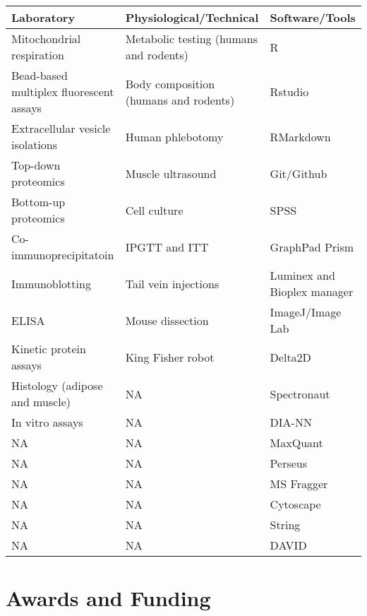 \documentclass[11pt,a4paper,]{awesome-cv}
\begin{document}
\begin{table}[!h]
\centering\begingroup\fontsize{8}{10}\selectfont

\begin{tabular}{lll}
\toprule
\textbf{Laboratory} & \textbf{Physiological/Technical} & \textbf{Software/Tools}\\
\midrule
Mitochondrial respiration & Metabolic testing (humans and rodents) & R\\
Bead-based multiplex fluorescent assays & Body composition (humans and rodents) & Rstudio\\
Extracellular vesicle isolations & Human phlebotomy & RMarkdown\\
Top-down proteomics & Muscle ultrasound & Git/Github\\
Bottom-up proteomics & Cell culture & SPSS\\
\addlinespace
Co-immunoprecipitatoin & IPGTT and ITT & GraphPad Prism\\
Immunoblotting & Tail vein injections & Luminex and Bioplex manager\\
ELISA & Mouse dissection & ImageJ/Image Lab\\
Kinetic protein assays & King Fisher robot & Delta2D\\
Histology (adipose and muscle) & NA & Spectronaut\\
\addlinespace
In vitro assays & NA & DIA-NN\\
NA & NA & MaxQuant\\
NA & NA & Perseus\\
NA & NA & MS Fragger\\
NA & NA & Cytoscape\\
\addlinespace
NA & NA & String\\
NA & NA & DAVID\\
\bottomrule
\end{tabular}
\endgroup{}
\end{table}

\newpage

\hypertarget{awards-and-funding}{%
\section{Awards and Funding}\label{awards-and-funding}}
\end{document}
